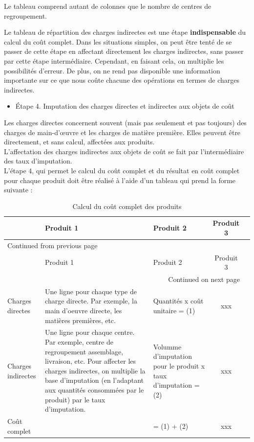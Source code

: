 \documentclass{kaobook}
\begin{document}
Le tableau comprend autant de colonnes que le nombre de centres de regroupement.\\
\begin{warning}
Le tableau de répartition des charges indirectes est une étape \textbf{indispensable} du calcul du coût complet. Dans les situations simples, on peut être tenté de se passer de cette étape en affectant directement les charges indirectes, sans passer par cette étape intermédiaire. Cependant, en faisant cela, on multiplie les possibilités d'erreur. De plus, on ne rend pas disponible une information importante sur ce que nous coûte chacune des opérations en termes de charges indirectes.\\
\end{warning}
\begin{itemize}
\item Étape 4. Imputation des charges directes et indirectes aux objets de coût\\
\end{itemize}
Les charges directes concernent souvent (mais pas seulement et pas toujours) des charges de main-d'œuvre et les charges de matière première. Elles peuvent être directement, et sans calcul, affectées aux produits.\\
L'affectation des charges indirectes aux objets de coût se fait par l'intermédiaire des taux d'imputation.\\
L'étape 4, qui permet le calcul du coût complet et du résultat en coût complet pour chaque produit doit être réalisé à l'aide d'un tableau qui prend la forme suivante :\\
\begin{longtable}{p{2cm} p{8cm} p{5cm} cp{2cm}}
\caption{Calcul du coût complet des produits}
\\
 & Produit 1 & Produit 2 & Produit 3\\
\hline
\endfirsthead
\multicolumn{4}{l}{Continued from previous page} \\
\hline

 & Produit 1 & Produit 2 & Produit 3 \\

\hline
\endhead
\hline\multicolumn{4}{r}{Continued on next page} \\
\endfoot
\endlastfoot
\hline
Charges directes & Une ligne pour chaque type de charge directe. Par exemple, la main d'oeuvre directe, les matières premières, etc. & Quantités x coût unitaire = (1) & xxx\\
Charges indirectes & Une ligne pour chaque centre. Par exemple, centre de regroupement assemblage, livraison, etc. Pour affecter les charges indirectes, on multiplie la base d'imputation (en l'adaptant aux quantités consommées par le produit) par le taux d'imputation. & Volumme d'imputation pour le produit x taux d'imputation = (2) & xxx\\
Coût complet &  & = (1) + (2) & xxx\\
\end{longtable}
\end{document}

